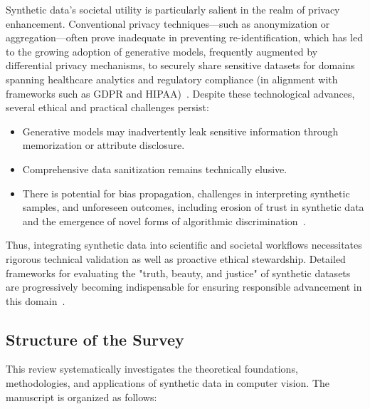 Synthetic data’s societal utility is particularly salient in the realm of privacy enhancement. Conventional privacy techniques—such as anonymization or aggregation—often prove inadequate in preventing re-identification, which has led to the growing adoption of generative models, frequently augmented by differential privacy mechanisms, to securely share sensitive datasets for domains spanning healthcare analytics and regulatory compliance (in alignment with frameworks such as GDPR and HIPAA)~\cite{ref5,ref6,ref12,ref13}. Despite these technological advances, several ethical and practical challenges persist:

\begin{itemize}
    \item Generative models may inadvertently leak sensitive information through memorization or attribute disclosure.
    \item Comprehensive data sanitization remains technically elusive.
    \item There is potential for bias propagation, challenges in interpreting synthetic samples, and unforeseen outcomes, including erosion of trust in synthetic data and the emergence of novel forms of algorithmic discrimination~\cite{ref12,ref35,ref87}.
\end{itemize}

Thus, integrating synthetic data into scientific and societal workflows necessitates rigorous technical validation as well as proactive ethical stewardship. Detailed frameworks for evaluating the "truth, beauty, and justice" of synthetic datasets are progressively becoming indispensable for ensuring responsible advancement in this domain~\cite{ref14,ref87}.

\subsection{Structure of the Survey}

This review systematically investigates the theoretical foundations, methodologies, and applications of synthetic data in computer vision. The manuscript is organized as follows:

